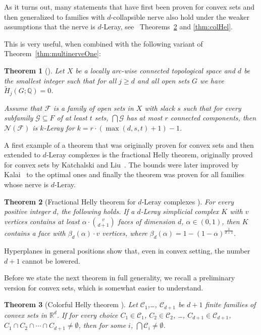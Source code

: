 \documentclass[a4paper,12pt]{amsart}
\newcommand{\R}{\mathbb{R}} 	%
\newcommand{\Q}{\mathbb{Q}} 	%
\newtheorem{theorem}{Theorem}
\theoremstyle{definition}
\begin{document}
As it turns out, many statements that have first been proven for convex sets and then generalized to families with $d$-collapsible nerve
also hold under the weaker assumptions that the nerve is $d$-Leray, see~ Theorems~\ref{thm:transversal-hypergraph} and \ref{thm:colHel}.

This is very useful, when combined with the following variant of Theorem~\ref{thm:multinerveOne}:
\begin{theorem}[\cite{multinerve13}]
Let $X$ be a locally arc-wise connected topological space and $d$ be the smallest integer such that for all $j\geq d$ and all open sets $G$  we have $\widetilde H_j(G;\Q)=0$.

Assume that $\mathcal F$ is a family of open sets in $X$ with slack $s$ such that for every subfamily $\mathcal G\subseteq F$
of at least $t$ sets, $\bigcap \mathcal G$ has at most $r$ connected components,
then $\mathcal N(\mathcal F)$
is $k$-Leray for $k=r\cdot \left(\max(d,s,t)+1\right)-1$.
\end{theorem}

A first example of a theorem that was originally proven for convex sets and then extended to $d$-Leray complexes is the fractional Helly theorem, originally proved for convex sets by Katchalski and Liu~\cite{fractional79}. The bounds were later improved by Kalai~\cite{Kalai84} to the optimal ones and finally the theorem was proven for all families whose nerve is $d$-Leray.
\begin{theorem}[Fractional Helly theorem for $d$-Leray complexes {\cite[Theorem 12]{transversal-hypergraph}}]\label{thm:transversal-hypergraph}
For every positive integer $d$, the following holds.
If a $d$-Leray simplicial complex $K$ with $v$ vertices
contains at least $\alpha \cdot \binom{v}{d+1}$ faces of dimension $d$, $\alpha\in(0,1)$,
then $K$ contains a face with $\beta_d(\alpha)\cdot v$ vertices, where $\beta_d(\alpha)=1-(1-\alpha)^{\frac{1}{d+1}}$.
\end{theorem}
Hyperplanes in general positions show that, even in convex setting, the number $d+1$ cannot be lowered.

Before we state the next theorem in full generality, we recall a preliminary version for convex sets, which is somewhat easier to understand.
\begin{theorem}[Colorful Helly theorem \cite{lovasz74}]\label{thm:colHelly}
Let $\mathcal C_1$,\ldots, $\mathcal C_{d+1}$ be $d+1$ finite families of convex sets in $\R^d$. If for every choice $C_1\in\mathcal C_1$, $C_2\in\mathcal C_2$, \ldots, $C_{d+1}\in\mathcal C_{d+1}$, $C_1\cap C_2\cap \cdots\cap C_{d+1}\neq \emptyset$, then for some 
$i$, $\bigcap \mathcal C_i\neq \emptyset$. 
\end{theorem}
\end{document}
